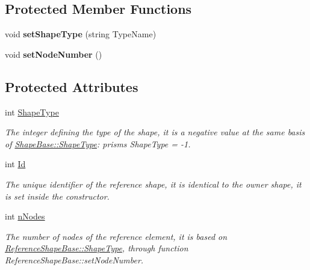 \subsection*{Protected Member Functions}
\begin{DoxyCompactItemize}
\item 
\hypertarget{classReferenceShapeBase_ad893cb0986899d77de34ce5e565ebb97}{}void {\bfseries set\+Shape\+Type} (string Type\+Name)\label{classReferenceShapeBase_ad893cb0986899d77de34ce5e565ebb97}

\item 
\hypertarget{classReferenceShapeBase_a027db08b5e580286448380aa21902b33}{}void {\bfseries set\+Node\+Number} ()\label{classReferenceShapeBase_a027db08b5e580286448380aa21902b33}

\end{DoxyCompactItemize}
\subsection*{Protected Attributes}
\begin{DoxyCompactItemize}
\item 
\hypertarget{classReferenceShapeBase_a4831a54cffbafef4ded26fb8c50566e0}{}int \hyperlink{classReferenceShapeBase_a4831a54cffbafef4ded26fb8c50566e0}{Shape\+Type}\label{classReferenceShapeBase_a4831a54cffbafef4ded26fb8c50566e0}

\begin{DoxyCompactList}\small\item\em The integer defining the type of the shape, it is a negative value at the same basis of \hyperlink{classShapeBase_a36aedd41e8465a186a0b0c454b5b76f3}{Shape\+Base\+::\+Shape\+Type}\+: prisms Shape\+Type = -\/1. \end{DoxyCompactList}\item 
\hypertarget{classReferenceShapeBase_af0da93cee3f17800d7aa90b21b1b81c7}{}int \hyperlink{classReferenceShapeBase_af0da93cee3f17800d7aa90b21b1b81c7}{Id}\label{classReferenceShapeBase_af0da93cee3f17800d7aa90b21b1b81c7}

\begin{DoxyCompactList}\small\item\em The unique identifier of the reference shape, it is identical to the owner shape, it is set inside the constructor. \end{DoxyCompactList}\item 
\hypertarget{classReferenceShapeBase_a1183c092056a3245a350ff6f56632633}{}int \hyperlink{classReferenceShapeBase_a1183c092056a3245a350ff6f56632633}{n\+Nodes}\label{classReferenceShapeBase_a1183c092056a3245a350ff6f56632633}

\begin{DoxyCompactList}\small\item\em The number of nodes of the reference element, it is based on \hyperlink{classReferenceShapeBase_a4831a54cffbafef4ded26fb8c50566e0}{Reference\+Shape\+Base\+::\+Shape\+Type}, through function Reference\+Shape\+Base\+::set\+Node\+Number. \end{DoxyCompactList}\end{DoxyCompactItemize}



